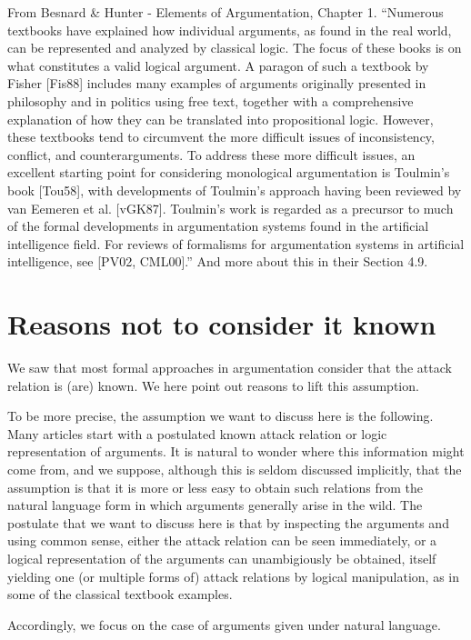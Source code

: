 \documentclass[version=3.21, pagesize, twoside=off, bibliography=totoc, DIV=calc, fontsize=12pt, a4paper, french, english]{scrartcl}
\begin{document}
From Besnard \& Hunter - Elements of Argumentation, Chapter 1. “Numerous textbooks have explained how individual arguments, as found in the real world, can be represented and analyzed by classical logic. The focus of these books is on what constitutes a valid logical argument. A paragon of such a textbook by Fisher [Fis88] includes many examples of arguments originally presented in philosophy and in politics using free text, together with a comprehensive explanation of how they can be translated into propositional logic. However, these textbooks tend to circumvent the more difficult issues of inconsistency, conflict, and counterarguments.
To address these more difficult issues, an excellent starting point for considering monological argumentation is Toulmin’s book [Tou58], with developments of Toulmin’s approach having been reviewed by van Eemeren et al. [vGK87]. Toulmin’s work is regarded as a precursor to much of the formal developments in argumentation systems found in the artificial intelligence field. For reviews of formalisms for argumentation systems in artificial intelligence, see [PV02, CML00].” And more about this in their Section 4.9.

\section{Reasons not to consider it known}
We saw that most formal approaches in argumentation consider that the attack relation is (are) known. 
We here point out reasons to lift this assumption.

To be more precise, the assumption we want to discuss here is the following.
Many articles start with a postulated known attack relation or logic representation of arguments. It is natural to wonder where this information might come from, and we suppose, although this is seldom discussed implicitly, that the assumption is that it is more or less easy to obtain such relations from the natural language form in which arguments generally arise in the wild. 
The postulate that we want to discuss here is that by inspecting the arguments and using common sense, either the attack relation can be seen immediately, or a logical representation of the arguments can unambigiously be obtained, itself yielding one (or multiple forms of) attack relations by logical manipulation, as in some of the classical textbook examples.

Accordingly, we focus on the case of arguments given under natural language. 
\end{document}
